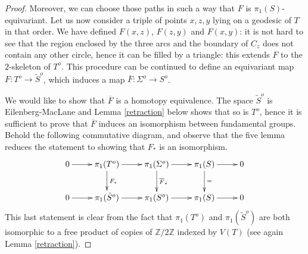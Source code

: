 \documentclass[10pt,a4paper]{amsart}
\renewcommand{\H}{\mathbb{H}}
\newcommand{\Z}{\mathbb{Z}}
\begin{document}
\begin{proof}
%
%

Moreover, we can choose those paths in such a way that $F$ is $\pi_1(S)$-equivariant. Let us now consider a triple of points $x,z,y$ lying on a geodesic of $T$ in that order. We have defined $F(x,z)$, $F(z,y)$ and $F(x,y)$: it is not hard to see that the region enclosed by the three arcs and the boundary of $C_z$ does not contain any other circle, hence it can be filled by a triangle: this extends $F$ to the $2$-skeleton of $T^o$. 
%
This procedure can be continued to define an equivariant map $F:T^o\to \tilde{S}^o$, which induces a map $\overline{F}:\Sigma^o\to S^o$.

We would like to show that $\overline{F}$ is a homotopy equivalence. The space $\tilde{S}^o$ is Eilenberg-MacLane and Lemma \ref{retraction} below shows that so is $T^o$, hence it is sufficient to prove that $\overline{F}$ induces an isomorphism between fundamental groups.
%
Behold the following commutative diagram, and observe that the five lemma reduces the statement to showing that $F_*$ is an isomorphism.
$$\xymatrix{
0\ar[r]& \pi_1(T^o)\ar[d]^{F_*}\ar[r] & \pi_1(\Sigma^o)\ar[r]\ar[d]^{\overline{F}_*}& \pi_1(S)\ar[d]^=\ar[r]& 0 \\
0\ar[r]& \pi_1(\tilde{S}^o)\ar[r] & \pi_1(S^o)\ar[r]& \pi_1(S)\ar[r]& 0 
}$$
This last statement is clear from the fact that $\pi_1(T^o)$ and $\pi_1(\tilde{S}^o)$ are both isomorphic to a free product of copies of $\Z/2\Z$ indexed by $V(T)$ (see again Lemma \ref{retraction}). 
\end{proof}
\end{document}
